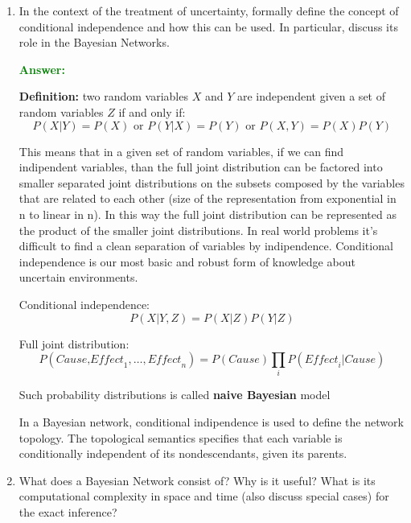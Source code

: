 \documentclass[12pt]{article}
\begin{document}
\begin{enumerate}[label=\textbf{U.\arabic*}]
    \item\label{q:cond_ind} In the context of the treatment of uncertainty, formally define the concept of conditional independence and how this can be used. 
    In particular, discuss its role in the Bayesian Networks.

    \textcolor{green}{\textbf{Answer:}}

    \textbf{Definition:} two random variables $X$ and $Y$ are independent given a set of random variables $Z$ if and only if:
    \begin{equation}\label{eq:prob_ind}
        P(X|Y) = P(X) \text{ or } P(Y|X) = P(Y) \text{ or } P(X,Y) = P(X)P(Y)
    \end{equation}

    This means that in a given set of random variables, if we can find indipendent variables, than the full joint distribution
    can be factored into smaller separated joint distributions on the subsets composed by the variables that are related to each other
    (size of the representation from exponential in n to linear in n).
    In this way the full joint distribution can be represented as the product of the smaller joint distributions.
    In real world problems it's difficult to find a clean separation of variables by indipendence.
    Conditional independence is our most basic and robust form of knowledge about uncertain environments.

    Conditional independence:
    \begin{equation}\label{eq:prob_cond_ind}
        P(X|Y,Z) = P(X|Z)P(Y|Z)
    \end{equation}

    Full joint distribution:
    \begin{equation}
        P(\textit{Cause,Effect}_1,\ldots,\textit{Effect}_n) = P(Cause)\prod_{i} P(\textit{Effect}_i|Cause)
    \end{equation}

    Such probability distributions is called \textbf{naive Bayesian} model

    In a Bayesian network, conditional indipendence is used to define the network topology.
    The topological semantics specifies that each variable is conditionally independent of its nondescendants, given its parents.

    \item\label{q:Bayesian-Net} What does a Bayesian Network consist of? 
    Why is it useful?
    What is its computational complexity in space and time (also discuss special cases) for the exact inference?


\end{enumerate}
\end{document}
